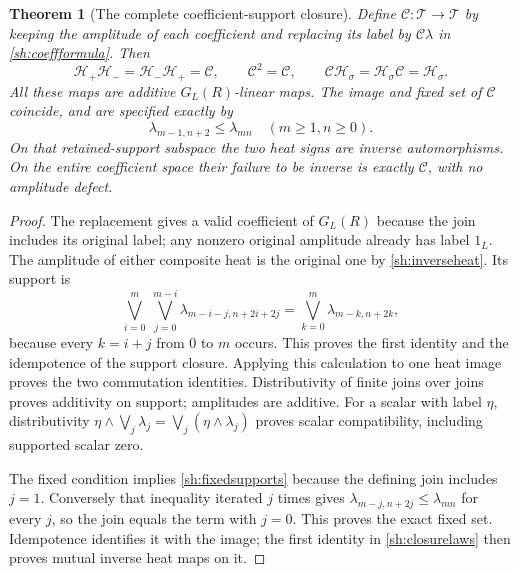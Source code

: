 \documentclass[11pt,a4paper]{article}
\newtheorem{theorem}{Theorem}[section]
\theoremstyle{definition}\newtheorem{definition}[theorem]{Definition}
\begin{document}
\begin{theorem}[The complete coefficient-support closure]
\label{sh:closure}
Define $\mathscr C:\mathscr T\to\mathscr T$ by keeping the
amplitude of each coefficient and replacing its label by
$\mathcal C\lambda$ in \eqref{sh:coeffformula}. Then
\begin{equation}\tag{SH33}\label{sh:closurelaws}
 \mathscr H_+\mathscr H_-=
 \mathscr H_-\mathscr H_+=\mathscr C,\qquad
 \mathscr C^2=\mathscr C,\qquad
 \mathscr C\mathscr H_\sigma=
 \mathscr H_\sigma\mathscr C=\mathscr H_\sigma.
\end{equation}
All these maps are additive $G_L(R)$-linear maps.
The image and fixed set of $\mathscr C$ coincide, and are
specified exactly by
\begin{equation}\tag{SH34}\label{sh:fixedsupports}
 \lambda_{m-1,n+2}\le\lambda_{mn}
       \quad(m\ge1,n\ge0).
\end{equation}
On that retained-support subspace the two heat signs are inverse
automorphisms. On the entire coefficient space their failure
to be inverse is exactly $\mathscr C$, with no amplitude defect.
\end{theorem}
\begin{proof}
The replacement gives a valid coefficient of $G_L(R)$ because
the join includes its original label; any nonzero original
amplitude already has label $1_L$. The amplitude of either
composite heat is the original one by \eqref{sh:inverseheat}.
Its support is
\[
 \bigvee_{i=0}^m\ \bigvee_{j=0}^{m-i}
       \lambda_{m-i-j,n+2i+2j}
 =\bigvee_{k=0}^m\lambda_{m-k,n+2k},
\]
because every $k=i+j$ from $0$ to $m$ occurs. This proves
the first identity and the idempotence of the support closure.
Applying this calculation to one heat image proves the two
commutation identities. Distributivity of finite joins over
joins proves additivity on support; amplitudes are additive.
For a scalar with label $\eta$, distributivity
$\eta\wedge\bigvee_j\lambda_j=
\bigvee_j(\eta\wedge\lambda_j)$ proves scalar compatibility,
including supported scalar zero.

The fixed condition implies \eqref{sh:fixedsupports} because
the defining join includes $j=1$. Conversely that inequality
iterated $j$ times gives
$\lambda_{m-j,n+2j}\le\lambda_{mn}$ for every $j$, so the
join equals the term with $j=0$. This proves the exact fixed
set. Idempotence identifies it with the image; the first
identity in \eqref{sh:closurelaws} then proves mutual inverse
heat maps on it.
\end{proof}
\end{document}
